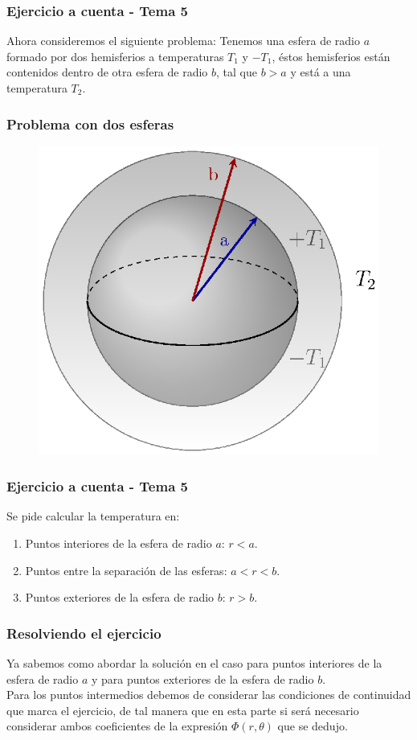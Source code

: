 \documentclass[12pt]{beamer}
\begin{document}
\begin{frame}
\frametitle{Ejercicio a cuenta - Tema 5}
Ahora consideremos el siguiente problema: Tenemos una esfera de radio $a$ formado por dos hemisferios a temperaturas $T_{1}$ y $-T_{1}$, éstos hemisferios están contenidos dentro de otra esfera de radio $b$, tal que $b > a$ y está a una temperatura $T_{2}$.
\end{frame}
\begin{frame}
\frametitle{Problema con dos esferas}
\begin{figure}
    \centering
    \includegraphics[scale=0.8]{Imagenes/Ejemplo_Esfera_02.eps}
\end{figure}
\end{frame}
\begin{frame}
\frametitle{Ejercicio a cuenta - Tema 5}
Se pide calcular la temperatura en:
\pause
{}
\begin{enumerate}[<+->]
\item Puntos interiores de la esfera de radio $a$: $r < a$.
\item Puntos entre la separación de las esferas: $a < r < b$.
\item Puntos exteriores de la esfera de radio $b$: $r > b$.
\end{enumerate}
\end{frame}
\begin{frame}
\frametitle{Resolviendo el ejercicio}
Ya sabemos como abordar la solución en el caso para puntos interiores de la esfera de radio $a$ y para puntos exteriores de la esfera de radio $b$.
\\
\bigskip
\pause
Para los puntos intermedios debemos de considerar las condiciones de continuidad que marca el ejercicio, de tal manera que en esta parte si será necesario considerar ambos coeficientes de la expresión $\Phi (r,\theta)$ que se dedujo.
\end{frame}
\end{document}
